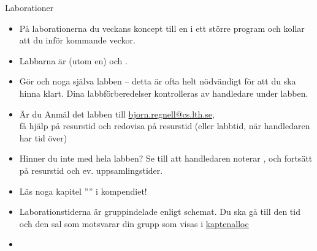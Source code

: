 \begin{SlideExtra}{Laborationer}\SlideFontSmall
\begin{itemize}
\item På laborationerna  du veckans koncept till en  i ett större program och kollar att du  inför kommande veckor.
\item Labbarna är  (utom en) och .

\item Gör  och  noga  själva labben -- detta är ofta helt nödvändigt för att du ska hinna klart. Dina labbförberedelser kontrolleras av handledare under labben.

\item Är du  Anmäl det  labben till \url{bjorn.regnell@cs.lth.se}, \\ få hjälp på resurstid och redovisa på resurstid (eller labbtid, när handledaren har tid över)

\item Hinner du inte med hela labben? Se till att handledaren noterar , och fortsätt på resurstid och ev. uppsamlingstider.

\item Läs noga kapitel '''' i kompendiet!

\item Laborationstiderna är gruppindelade enligt schemat. Du ska gå till den tid och den sal som motsvarar din grupp som visas i \href{https://fileadmin.cs.lth.se/pgk/kaptenalloc/}{kaptenalloc}\\
\item {}
\end{itemize}
\end{SlideExtra}





